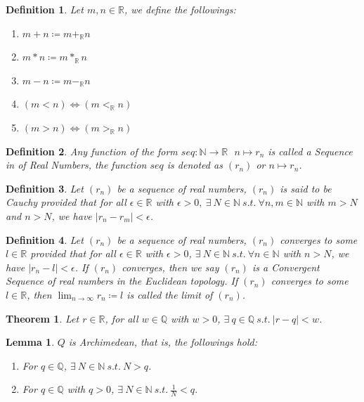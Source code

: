 \documentclass[11pt]{article}
\theoremstyle{break}
\theoremstyle{break}
\newtheorem{thm}{Theorem}[section]
\newtheorem{lem}{Lemma}[thm]
\newtheorem{defn}{Definition}[corL]
\newcommand{\R}{\mathbb{R}}
\newcommand{\N}{\mathbb{N}}
\newcommand{\Q}{\mathbb{Q}}
\begin{document}
	\begin{defn}
		Let $m,n \in \R$, we define the followings:
		\begin{enumerate}[topsep=3pt,itemsep=-1ex,partopsep=1ex,parsep=1ex]
			\item $m+n \coloneqq m +_\R n$
			\item $m \ast n \coloneqq m \ast_\R n$
			\item $m-n \coloneqq m -_\R n$
			\item $(m<n) \iff (m <_\R n)$
			\item $(m>n) \iff (m >_\R n)$
		\end{enumerate} 
	\end{defn}
	
	\begin{defn}
		Any function of the form $seq:\N \to \R \ \ \ n \mapsto r_n$ is called a Sequence in of Real Numbers, the function $seq$ is denoted as $(r_n)$ or $n \mapsto r_n$.
	\end{defn}	
	
	\begin{defn}
		Let $(r_n)$ be a sequence of real numbers, $(r_n)$ is said to be Cauchy provided that for all $\epsilon \in \R$ with $\epsilon > 0, \ \exists \ N \in \N \ s.t. \ \forall n,m \in \N$ with $m > N$ and $n > N$, we have $|r_n - r_m| < \epsilon$.
	\end{defn}
	
	\begin{defn}
		Let $(r_n)$ be a sequence of real numbers, $(r_n)$ converges to some $l \in \R$ provided that for all $\epsilon \in \R$ with $\epsilon>0$, $\exists \ N \in \N \ s.t. \ \forall n \in \N$ with $n>N$, we have $|r_n - l|<\epsilon$. If $(r_n)$ converges, then we say $(r_n)$ is a Convergent Sequence of real numbers in the Euclidean topology. If $(r_n)$ converges to some $l \in \R$, then $\lim_{n \to \infty}r_n \coloneqq l$ is called the limit of $(r_n)$.
	\end{defn}
	
	\begin{thm}
		Let $r \in \R$, for all $w \in \Q$ with $w>0$, $\exists \ q \in \Q \ s.t. \ |r-q|<w$.
	\end{thm}
	
	\begin{lem}
		$Q$ is Archimedean, that is, the followings hold:
		\begin{enumerate}[topsep=3pt,itemsep=-1ex,partopsep=1ex,parsep=1ex]
			\item For $q \in \Q$, $\exists \ N \in \N \ s.t. \ N>q$.
			\item For $q \in \Q$ with $q>0$, $\exists \ N \in \N \ s.t. \ \frac{1}{N}<q$.
		\end{enumerate}
	\end{lem}
	
\end{document}

